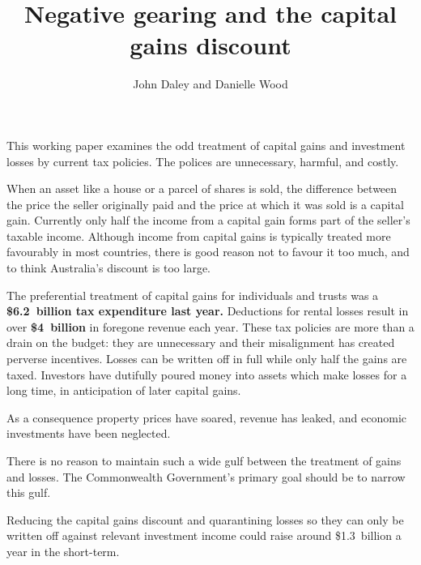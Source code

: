 \documentclass{grattan}\usepackage[]{graphicx}\usepackage[]{color}
\title{Negative gearing and the capital gains discount}
\author{John Daley and Danielle Wood}
\newcommand{\highlight}[1]{\textbf{#1}}
\begin{document}
\clearpage


\raggedbottom















\begin{summary}
This working paper examines the odd treatment of capital gains and investment losses by current tax policies. The polices are unnecessary, harmful, and costly. 

When an asset like a house or a parcel of shares is sold, the difference between the price the seller originally paid and the price at which it was sold is a capital gain. Currently only half the income from a capital gain forms part of the seller's taxable income. Although income from capital gains is typically treated more favourably in most countries, there is good reason not to favour it too much, and to think Australia's discount is too large.

The preferential treatment of capital gains for individuals and trusts was a \highlight{\$6.2~billion tax expenditure last year.} Deductions for rental losses result in over \highlight{\$4~billion} in foregone revenue each year. These tax policies are more than a drain on the budget: they are unnecessary and their misalignment has created perverse incentives. Losses can be written off in full while only half the gains are taxed. Investors have dutifully poured money into assets which make losses for a long time, in anticipation of later capital gains.

As a consequence property prices have soared, revenue has leaked, and economic investments have been neglected. 

There is no reason to maintain such a wide gulf between the treatment of gains and losses. The Commonwealth Government's primary goal should be to narrow this gulf.

Reducing the capital gains discount and quarantining losses so they can only be written off against relevant investment income could raise around \$1.3~billion a year in the short-term.
\end{summary}
\end{document}
